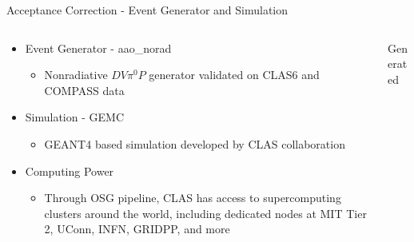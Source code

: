 \documentclass[aspectratio=169]{beamer}
\begin{document}
\begin{frame}{Acceptance Correction - Event Generator and Simulation}
     \begin{columns}[c]
               \begin{column}{0.5\textwidth}

                    \begin{itemize}
                        \item Event Generator - aao\_norad
                            \begin{itemize}
                                \item Nonradiative $DV\pi^0P$ generator validated on CLAS6 and COMPASS data
                            \end{itemize}
                        \item Simulation - GEMC
                            \begin{itemize}
                                \item GEANT4 based simulation developed by CLAS collaboration
                            \end{itemize}
                        \item Computing Power
                            \begin{itemize}
                                \item Through OSG pipeline, CLAS has access to supercomputing clusters around the world, including dedicated nodes at MIT Tier 2, UConn, INFN, GRIDPP, and more
                            \end{itemize}
                    \end{itemize}
                    \end{column}
                    
                    
    \begin{column}{0.5\textwidth}
                
                \centering Generated \\
        \begin{columns}
                    
                             

\end{columns}
\end{column}
\end{columns}
\end{frame}
\end{document}
